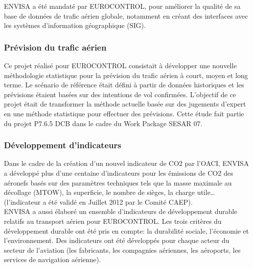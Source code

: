 \documentclass[a4paper,12pt,twoside]{article}
\begin{document}
    ENVISA a été mandaté par EUROCONTROL, pour améliorer la qualité de sa base de données de trafic aérien globale, notamment en créant des interfaces avec les systèmes d'information géographique (SIG).
    \subsubsection*{Prévision du trafic aérien}
    Ce projet réalisé pour EUROCONTROL consistait à développer une nouvelle méthodologie statistique pour la prévision du trafic aérien à court, moyen et long terme. Le scénario de référence était défini à partir de données historiques et les prévisions étaient basées sur des intentions de vol confirmées. L'objectif de ce projet était de transformer la méthode actuelle basée sur des jugements d'expert en une méthode statistique pour effectuer des prévisions. Cette étude fait partie du projet P7.6.5 DCB dans le cadre du Work Package SESAR 07.
    \subsubsection*{Développement d'indicateurs}
    Dans le cadre de la création d'un nouvel indicateur de \gls{CO2} par l'\gls{OACI}, ENVISA a développé plus d'une centaine d'indicateurs pour les émissions de CO2 des aéronefs basés sur des paramètres techniques tels que la masse maximale au décollage (\gls{MTOW}), la superficie, le nombre de sièges, la charge utile… (l'indicateur a été validé en Juillet 2012 par le Comité CAEP).\\
    ENVISA a aussi élaboré un ensemble d'indicateurs de développement durable relatifs au transport aérien pour EUROCONTROL. Les trois critères du développement durable ont été pris en compte: la durabilité sociale, l'économie et l'environnement. Des indicateurs ont été développés pour chaque acteur du secteur de l'aviation (les fabricants, les compagnies aériennes, les aéroports, les services de navigation aérienne).
\end{document}

